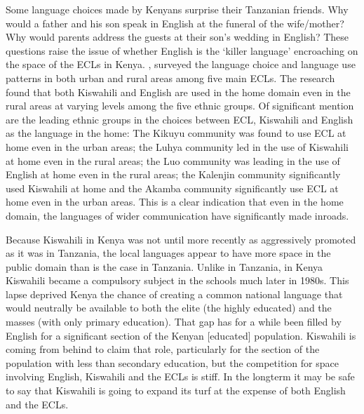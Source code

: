 \documentclass[output=paper,colorlinks,citecolor=brown]{langscibook}
\begin{document}
Some language choices made by Kenyans surprise their Tanzanian friends. Why would a father and his son speak in English at the funeral of the wife\slash mother? Why would parents address the guests at their son’s wedding in English? These questions raise the issue of whether English is the ‘killer language’ encroaching on the space of the ECLs in Kenya.  \cite{MuthwiiKioko2002}, surveyed the language choice and language use patterns in both urban and rural areas among five main ECLs.  The research found that both Kiswahili and English are used in the home domain even in the rural areas at varying levels among the five ethnic groups.  Of significant mention are the leading ethnic groups in the choices between ECL, Kiswahili and English as the language in the home: The Kikuyu community was found to use ECL at home even in the urban areas; the Luhya community led in the use of Kiswahili at home even in the rural areas; the Luo community was leading in the use of English at home even in the rural areas; the Kalenjin community significantly used Kiswahili at home and the Akamba community significantly use ECL at home even in the urban areas.   This is a clear indication that even in the home domain, the languages of wider communication have significantly made inroads.

Because Kiswahili in Kenya was not until more recently as aggressively promoted as it was in Tanzania, the local languages appear to have more space in the public domain than is the case in Tanzania. Unlike in Tanzania, in Kenya Kiswahili became a compulsory subject in the schools much later in 1980s. This lapse deprived Kenya the chance of creating a common national language that would neutrally be available to both the elite (the highly educated) and the masses (with only primary education).  That gap has for a while been filled by English for a significant section of the Kenyan [educated] population.  Kiswahili is coming from behind to claim that role, particularly for the section of the population with less than secondary education, but the competition for space involving English, Kiswahili and the ECLs is stiff. In the longterm it may be safe to say that Kiswahili is going to expand its turf at the expense of both English and the ECLs.  
\end{document}
